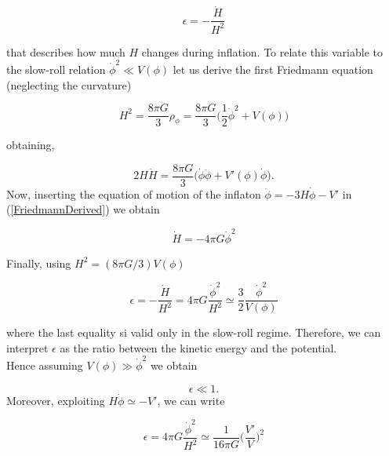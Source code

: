 \documentclass[11pt,a4paper,twoside]{book}
\begin{document}
\begin{equation}
	\label{epsilon}
	\epsilon = - \frac{\dot{H}}{H^{2}}
\end{equation}

that describes how much $ H $ changes during inflation.
To relate this variable to the slow-roll relation $ \dot{\phi}^{2} \ll V(\phi) $ let us derive the first Friedmann equation (neglecting the curvature)

\begin{equation}
	\label{derivingEpsilon1}
	H^{2}=\frac{8\pi G}{3}\rho_{\phi} = \frac{8\pi G}{3} \Big (\frac{1}{2}\dot{\phi}^{2} + V(\phi) \Big )
\end{equation}

obtaining,

\begin{equation}
	\label{FriedmannDerived}
	2H\dot{H} = \frac{8\pi G}{3} \Big (\dot{\phi} \ddot{\phi} + V'(\phi)\dot{\phi} \Big ).
\end{equation}
Now, inserting the equation of motion of the inflaton $ \ddot{\phi} = -3H\dot{\phi} - V'  $ in (\ref{FriedmannDerived}) we obtain

\begin{equation}
	\label{Hdot}
	\dot{H} = -4\pi G\dot{\phi}^{2}
\end{equation}

Finally, using $ H^{2}=(8\pi G/3)V(\phi) $  

\begin{equation}
	\label{epsilon2}
	\epsilon= - \frac{\dot{H}}{H^{2}}=4\pi G \frac{\dot{\phi}^{2}}{H^{2}} \simeq \frac{3}{2} \frac{\dot{\phi}^{2}}{V(\phi)}
\end{equation}

where the last equality si valid only in the slow-roll regime. Therefore, we can interpret $\epsilon$ as the ratio between the kinetic energy and the potential. \\
Hence assuming $ V(\phi) \gg \dot{\phi}^{2}  $ we obtain 

\begin{equation}
	\label{conditionEpsilon}
	\epsilon \ll 1 .
\end{equation}
Moreover, exploiting $ H\dot{\phi} \simeq -V' $, we can write

\begin{equation}
	\label{newEpsilon}
	\epsilon=4\pi G \frac{\dot{\phi}^{2}}{H^{2}} \simeq \frac{1}{16\pi G} \Big (\frac{V'}{V} \Big )^{2}	
\end{equation}
\end{document}

